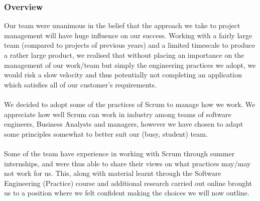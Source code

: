 \documentclass[10pt]{article}
\begin{document}
\subsubsection{Overview}
Our team were unanimous in the belief that the approach we take to project management will have huge influence on our success. Working with a fairly large team (compared to projects of previous years) and a limited timescale to produce a rather large product, we realised that without placing an importance on the management of our work/team but simply the engineering practices we adopt, we would risk a slow velocity and thus potentially not completing an application which satisfies all of our customer's requirements.\\\\
We decided to adopt some of the practices of Scrum to manage how we work. We appreciate how well Scrum can work in industry among teams of software engineers, Business Analysts and managers, however we have chosen to adapt some principles somewhat to better suit our (busy, student) team.\\\\
Some of the team have experience in working with Scrum through summer internships, and were thus able to share their views on what practices may/may not work for us. This, along with material learnt through the Software Engineering (Practice) course and additional research carried out online brought us to a position where we felt confident making the choices we will now outline.
\end{document}
